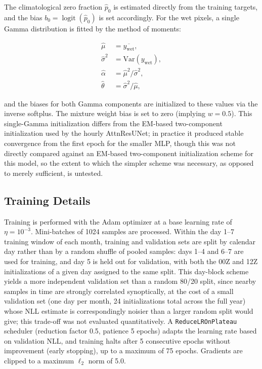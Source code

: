 \documentclass[11pt]{article}
\DeclareMathOperator{\logit}{logit}
\begin{document}
The climatological zero fraction $\hat{p}_0$ is estimated directly from the
training targets, and the bias $b_0 = \logit(\hat{p}_0)$ is set accordingly.
For the wet pixels, a single Gamma distribution is fitted by the method of
moments:
\begin{linenomath}
\begin{align}
  \hat{\mu}      &= \overline{y_{\text{wet}}}, \\
  \hat{\sigma}^2 &= \text{Var}(y_{\text{wet}}), \\
  \hat{\alpha}   &= \hat{\mu}^2 / \hat{\sigma}^2, \\
  \hat{\theta}   &= \hat{\sigma}^2 / \hat{\mu},
\end{align}
\end{linenomath}
and the biases for both Gamma components are initialized to these values via
the inverse softplus.  The mixture weight bias is set to zero (implying
$w = 0.5$).  This single-Gamma initialization differs from the EM-based
two-component initialization used by the hourly AttnResUNet; in practice it
produced stable convergence from the first epoch for the smaller MLP, though
this was not directly compared against an EM-based two-component
initialization scheme for this model, so the extent to which the simpler
scheme was necessary, as opposed to merely sufficient, is untested.

\subsection{Training Details}
\label{sec:training}

Training is performed with the Adam optimizer \citep{kingma2015} at a
base learning rate of $\eta = 10^{-3}$.  Mini-batches of 1024 samples are
processed.  Within the day 1--7 training window of each month, training
and validation sets are split by calendar day rather than by a random
shuffle of pooled samples: days 1--4 and 6--7 are used for training, and
day 5 is held out for validation, with both the 00Z and 12Z initializations
of a given day assigned to the same split.  This day-block scheme yields a
more independent validation set than a random 80/20 split, since nearby
samples in time are strongly correlated synoptically, at the cost of a
small validation set (one day per month, 24 initializations total across
the full year) whose NLL estimate is correspondingly noisier than a larger
random split would give; this trade-off was not evaluated quantitatively.  A
\texttt{ReduceLROnPlateau} scheduler (reduction factor 0.5, patience
5 epochs) adapts the learning rate based on validation NLL, and training
halts after 5 consecutive epochs without improvement (early stopping),
up to a maximum of 75 epochs.  Gradients are clipped to a maximum
$\ell_2$ norm of 5.0.
\end{document}
